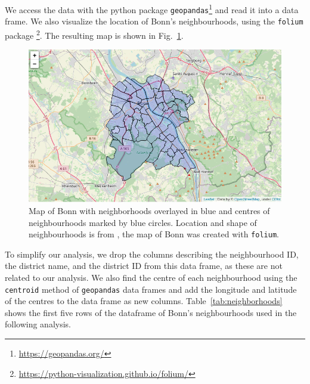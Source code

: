 \documentclass[UKenglish]{scrreprt}
\begin{document}
We access the data with the python package \verb|geopandas|\footnote{\href{https://geopandas.org/}{https://geopandas.org/}} and read it into a data frame. We also visualize the location of Bonn's neighbourhoods, using the \verb|folium| package \footnote{\href{https://python-visualization.github.io/folium/}{https://python-visualization.github.io/folium/}}. The resulting map is shown in Fig.~\ref{fig:map neighbourhoods}.

\begin{figure}[htbp]
	\centering
	\includegraphics[width=\textwidth]{Figs/Map_Neighborhoods.png}
	\caption{Map of Bonn with neighborhoods overlayed in blue and centres of neighbourhoods marked by blue circles. Location and shape of neighbourhoods is from \cite{Ortsteile}, the map of Bonn was created with \texttt{folium}.}
	\label{fig:map neighbourhoods}
\end{figure}

To simplify our analysis, we drop the columns describing the neighbourhood ID, the district name, and the district ID from this data frame, as these are not related to our analysis. We also find the centre of each neighbourhood using the \verb|centroid| method of \verb|geopandas| data frames and add the longitude and latitude of the centres to the data frame as new columns. Table~\ref{tab:neighborhoods} shows the first five rows of the dataframe of Bonn's neighbourhoods used in the following analysis.
\end{document}
